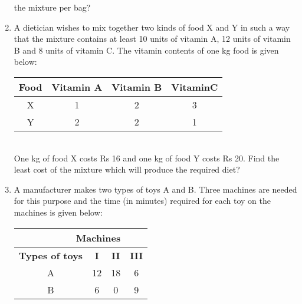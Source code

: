 \begin{enumerate}[label=\arabic*.,ref=\thesection.\theenumi]
the mixture per bag?\\
\item A dietician wishes to mix together two kinds of food X and Y in such a way that
the mixture contains at least 10 units of vitamin A, 12 units of vitamin B and
8 units of vitamin C. The vitamin contents of one kg food is given below:\\
\begin{tabular}{|c|c|c|c|}
\hline
\textbf{Food} &\textbf{Vitamin A} &\textbf{Vitamin B} & \textbf{VitaminC}\\
\hline
X & 1 & 2 & 3\\
\hline
Y &2 &2 &1\\
\hline


\end{tabular}\\
One kg of food X costs Rs 16 and one kg of food Y costs Rs 20. Find the least
cost of the mixture which will produce the required diet?\\
\item A manufacturer makes two types of toys A and B. Three machines are needed
for this purpose and the time (in minutes) required for each toy on the machines
is given below:\\
\begin{tabular}{|c|c|c|c|}
\hline
 \multicolumn{3}{|r}{\textbf{ Machines}}& \\ \cline{2-4}
\hline
\textbf {Types of toys}&\textbf{I}&\textbf{II}&\textbf{III}\\
\hline
A&12&18&6\\
\hline
 B&6&0&9\\
 \hline 

\end{tabular}




\end{enumerate}
